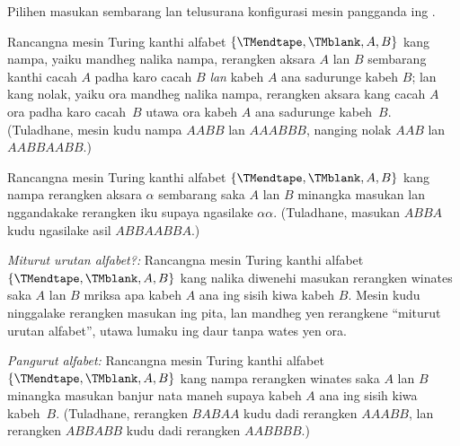 \documentclass[../../../include/open-logic-section]{subfiles}
\begin{document}
\begin{prob}
Pilihen masukan sembarang lan telusurana konfigurasi
mesin pangganda ing .
\end{prob}

\begin{prob}
Rancangna mesin Turing kanthi alfabet
$\{\TMendtape,\TMblank, A, B\}$ kang nampa,
yaiku mandheg nalika nampa, rerangken aksara
$A$ lan $B$ sembarang kanthi cacah $A$
padha karo cacah $B$ \emph{lan} kabeh $A$
ana sadurunge kabeh $B$; lan kang nolak,
yaiku ora mandheg nalika nampa, rerangken
aksara kang cacah $A$ ora padha karo cacah~$B$
utawa ora kabeh $A$ ana sadurunge kabeh~$B$.
(Tuladhane, mesin kudu nampa $AABB$ lan
$AAABBB$, nanging nolak $AAB$ lan $AABBAABB$.)
\end{prob}

\begin{prob}
Rancangna mesin Turing kanthi alfabet
$\{\TMendtape,\TMblank, A, B\}$ kang nampa
rerangken aksara $\alpha$ sembarang saka $A$
lan $B$ minangka masukan lan nggandakake
rerangken iku supaya ngasilake $\alpha\alpha$.
(Tuladhane, masukan $ABBA$ kudu ngasilake
asil $ABBAABBA$.)
\end{prob}

\begin{prob}
\emph{Miturut urutan alfabet?:} Rancangna
mesin Turing kanthi alfabet
$\{\TMendtape,\TMblank, A, B\}$ kang nalika
diwenehi masukan rerangken winates saka $A$
lan $B$ mriksa apa kabeh $A$ ana ing
sisih kiwa kabeh $B$. Mesin kudu ninggalake
rerangken masukan ing pita, lan mandheg yen
rerangkene ``miturut urutan alfabet'',
utawa lumaku ing daur tanpa wates yen ora.
\end{prob}

\begin{prob}
\emph{Pangurut alfabet:} Rancangna mesin
Turing kanthi alfabet
$\{\TMendtape,\TMblank, A, B\}$ kang nampa
rerangken winates saka $A$ lan $B$ minangka
masukan banjur nata maneh supaya kabeh $A$
ana ing sisih kiwa kabeh~$B$. (Tuladhane,
rerangken $BABAA$ kudu dadi rerangken $AAABB$,
lan rerangken $ABBABB$ kudu dadi rerangken
$AABBBB$.)
\end{prob}
\end{document}
